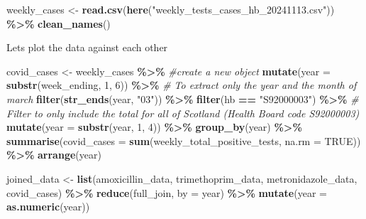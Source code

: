 \documentclass[
]{article}
\newenvironment{Shaded}{\begin{snugshade}}{\end{snugshade}}
\newcommand{\AttributeTok}[1]{\textcolor[rgb]{0.13,0.29,0.53}{#1}}
\newcommand{\CommentTok}[1]{\textcolor[rgb]{0.56,0.35,0.01}{\textit{#1}}}
\newcommand{\ConstantTok}[1]{\textcolor[rgb]{0.56,0.35,0.01}{#1}}
\newcommand{\DecValTok}[1]{\textcolor[rgb]{0.00,0.00,0.81}{#1}}
\newcommand{\FunctionTok}[1]{\textcolor[rgb]{0.13,0.29,0.53}{\textbf{#1}}}
\newcommand{\NormalTok}[1]{#1}
\newcommand{\OtherTok}[1]{\textcolor[rgb]{0.56,0.35,0.01}{#1}}
\newcommand{\SpecialCharTok}[1]{\textcolor[rgb]{0.81,0.36,0.00}{\textbf{#1}}}
\newcommand{\StringTok}[1]{\textcolor[rgb]{0.31,0.60,0.02}{#1}}
\begin{document}
\begin{Shaded}
\begin{Highlighting}[]
\NormalTok{weekly\_cases }\OtherTok{\textless{}{-}} \FunctionTok{read.csv}\NormalTok{(}\FunctionTok{here}\NormalTok{(}\StringTok{"weekly\_tests\_cases\_hb\_20241113.csv"}\NormalTok{)) }\SpecialCharTok{\%\textgreater{}\%} 
  \FunctionTok{clean\_names}\NormalTok{()}
\end{Highlighting}
\end{Shaded}

Lets plot the data against each other

\begin{Shaded}
\begin{Highlighting}[]
\NormalTok{covid\_cases }\OtherTok{\textless{}{-}}\NormalTok{ weekly\_cases }\SpecialCharTok{\%\textgreater{}\%} \CommentTok{\#create a new object}
  \FunctionTok{mutate}\NormalTok{(}\AttributeTok{year =} \FunctionTok{substr}\NormalTok{(week\_ending, }\DecValTok{1}\NormalTok{, }\DecValTok{6}\NormalTok{)) }\SpecialCharTok{\%\textgreater{}\%} \CommentTok{\# To extract only the year and the month of march}
  \FunctionTok{filter}\NormalTok{(}\FunctionTok{str\_ends}\NormalTok{(year, }\StringTok{"03"}\NormalTok{)) }\SpecialCharTok{\%\textgreater{}\%}
  \FunctionTok{filter}\NormalTok{(hb }\SpecialCharTok{==} \StringTok{"S92000003"}\NormalTok{) }\SpecialCharTok{\%\textgreater{}\%} \CommentTok{\# Filter to only include the total for all of Scotland (Health Board code S92000003)}
  \FunctionTok{mutate}\NormalTok{(}\AttributeTok{year =} \FunctionTok{substr}\NormalTok{(year, }\DecValTok{1}\NormalTok{, }\DecValTok{4}\NormalTok{)) }\SpecialCharTok{\%\textgreater{}\%}
  \FunctionTok{group\_by}\NormalTok{(year) }\SpecialCharTok{\%\textgreater{}\%} 
  \FunctionTok{summarise}\NormalTok{(}\AttributeTok{covid\_cases =} \FunctionTok{sum}\NormalTok{(weekly\_total\_positive\_tests, }\AttributeTok{na.rm =} \ConstantTok{TRUE}\NormalTok{)) }\SpecialCharTok{\%\textgreater{}\%}
  \FunctionTok{arrange}\NormalTok{(year)}

\NormalTok{joined\_data }\OtherTok{\textless{}{-}} \FunctionTok{list}\NormalTok{(amoxicillin\_data, trimethoprim\_data, metronidazole\_data, covid\_cases) }\SpecialCharTok{\%\textgreater{}\%} 
  \FunctionTok{reduce}\NormalTok{(full\_join, }\AttributeTok{by =} \StringTok{\textquotesingle{}year\textquotesingle{}}\NormalTok{) }\SpecialCharTok{\%\textgreater{}\%} 
  \FunctionTok{mutate}\NormalTok{(}\AttributeTok{year =} \FunctionTok{as.numeric}\NormalTok{(year))}


\end{Highlighting}
\end{Shaded}
\end{document}
